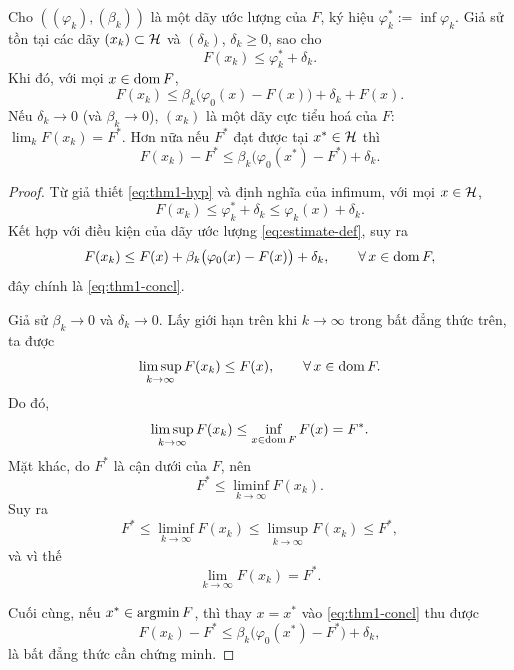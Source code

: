\begin{theorem}
\label{thm:estimate-main}
Cho $((\varphi_k),(\beta_k))$ là một dãy ước lượng của $F$, ký hiệu
$\varphi_k^* := \inf\varphi_k$. Giả sử tồn tại các dãy $(x_k)\subset\mathcal{H}$
và $(\delta_k)$, $\delta_k\ge0$, sao cho
\begin{equation}
  F(x_k) \le \varphi_k^* + \delta_k.
  \label{eq:thm1-hyp}
\end{equation}
Khi đó, với mọi $x\in\operatorname{dom} F$,
\begin{equation}
  F(x_k) \le \beta_k\big(\varphi_0(x)-F(x)\big) + \delta_k + F(x).
  \label{eq:thm1-concl}
\end{equation}
Nếu $\delta_k\to0$ (và $\beta_k\to0$), $(x_k)$ là một dãy cực tiểu
hoá của $F$: $\lim_k F(x_k) = F^*$. Hơn nữa nếu $F^*$ đạt được tại
$x^*\in\mathcal{H}$ thì
\[
  F(x_k) - F^* \le \beta_k\big(\varphi_0(x^*)-F^*\big) + \delta_k.
\]
\end{theorem}
\begin{essayonly}
\begin{proof}
Từ giả thiết \eqref{eq:thm1-hyp} và định nghĩa của infimum, với mọi
$x\in\mathcal{H}$,
\[
F(x_k)\le \varphi_k^*+\delta_k
      \le \varphi_k(x)+\delta_k.
\]
Kết hợp với điều kiện của dãy ước lượng \eqref{eq:estimate-def}, suy ra
\[
F(x_k)
\le
F(x)+\beta_k\bigl(\varphi_0(x)-F(x)\bigr)+\delta_k,
\qquad \forall\,x\in\operatorname{dom} F,
\]
đây chính là \eqref{eq:thm1-concl}.

Giả sử $\beta_k\to0$ và $\delta_k\to0$. Lấy giới hạn trên khi
$k\to\infty$ trong bất đẳng thức trên, ta được
\[
\limsup_{k\to\infty}F(x_k)\le F(x),
\qquad \forall\,x\in\operatorname{dom} F.
\]
Do đó,
\[
\limsup_{k\to\infty}F(x_k)
\le
\inf_{x\in\operatorname{dom} F}F(x)
=F^*.
\]
Mặt khác, do $F^*$ là cận dưới của $F$, nên
\[
F^*\le \liminf_{k\to\infty}F(x_k).
\]
Suy ra
\[
F^*
\le
\liminf_{k\to\infty}F(x_k)
\le
\limsup_{k\to\infty}F(x_k)
\le
F^*,
\]
và vì thế
\[
\lim_{k\to\infty}F(x_k)=F^*.
\]

Cuối cùng, nếu $x^*\in\operatorname*{argmin} F$, thì thay $x=x^*$ vào
\eqref{eq:thm1-concl} thu được
\[
F(x_k)-F^*
\le
\beta_k\bigl(\varphi_0(x^*)-F^*\bigr)+\delta_k,
\]
là bất đẳng thức cần chứng minh.
\end{proof}
\end{essayonly}

